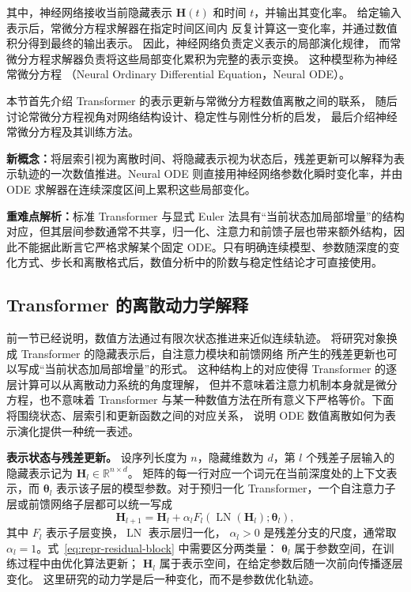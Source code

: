 其中，神经网络接收当前隐藏表示
\(\boldsymbol{H}(t)\)
和时间 \(t\)，并输出其变化率。
给定输入表示后，常微分方程求解器在指定时间区间内
反复计算这一变化率，并通过数值积分得到最终的输出表示。
因此，神经网络负责定义表示的局部演化规律，
而常微分方程求解器负责将这些局部变化累积为完整的表示变换。
这种模型称为神经常微分方程
（Neural Ordinary Differential Equation，Neural ODE）。

本节首先介绍 Transformer 的表示更新与常微分方程数值离散之间的联系，
随后讨论常微分方程视角对网络结构设计、稳定性与刚性分析的启发，
最后介绍神经常微分方程及其训练方法。

\begin{importantnote}
\textbf{新概念：}将层索引视为离散时间、将隐藏表示视为状态后，残差更新可以解释为表示轨迹的一次数值推进。Neural ODE 则直接用神经网络参数化瞬时变化率，并由 ODE 求解器在连续深度区间上累积这些局部变化。

\textbf{重难点解析：}标准 Transformer 与显式 Euler 法具有“当前状态加局部增量”的结构对应，但其层间参数通常不共享，归一化、注意力和前馈子层也带来额外结构，因此不能据此断言它严格求解某个固定 ODE。只有明确连续模型、参数随深度的变化方式、步长和离散格式后，数值分析中的阶数与稳定性结论才可直接使用。
\end{importantnote}

\subsection{Transformer 的离散动力学解释}

前一节已经说明，数值方法通过有限次状态推进来近似连续轨迹。
将研究对象换成 Transformer 的隐藏表示后，自注意力模块和前馈网络
所产生的残差更新也可以写成“当前状态加局部增量”的形式。
这种结构上的对应使得 Transformer 的逐层计算可以从离散动力系统的角度理解，
但并不意味着注意力机制本身就是微分方程，也不意味着 Transformer
与某一种数值方法在所有意义下严格等价。下面将围绕状态、层索引和更新函数之间的对应关系，
说明 ODE 数值离散如何为表示演化提供一种统一表述。

\textbf{表示状态与残差更新。}
设序列长度为 \(n\)，隐藏维数为 \(d\)，第 \(l\) 个残差子层输入的
隐藏表示记为
\(\boldsymbol{H}_{l}\in\mathbb{R}^{n\times d}\)。
矩阵的每一行对应一个词元在当前深度处的上下文表示，而
\(\boldsymbol{\theta}_{l}\) 表示该子层的模型参数。对于预归一化
Transformer，一个自注意力子层或前馈网络子层都可以统一写成
\begin{equation}
    \boldsymbol{H}_{l+1}
    =
    \boldsymbol{H}_{l}
    +
    \alpha_l
    F_l\!\left(
        \operatorname{LN}(\boldsymbol{H}_{l});
        \boldsymbol{\theta}_{l}
    \right),
    \label{eq:repr-residual-block}
\end{equation}
其中 \(F_l\) 表示子层变换，\(\operatorname{LN}\) 表示层归一化，
\(\alpha_l>0\) 是残差分支的尺度，通常取
\(\alpha_l=1\)。式~\eqref{eq:repr-residual-block} 中需要区分两类量：
\(\boldsymbol{\theta}_{l}\) 属于参数空间，在训练过程中由优化算法更新；
\(\boldsymbol{H}_{l}\) 属于表示空间，在给定参数后随一次前向传播逐层变化。
这里研究的动力学是后一种变化，而不是参数优化轨迹。

